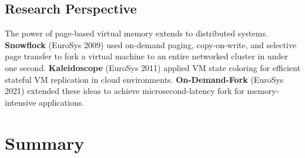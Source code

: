 \documentclass[11pt]{article}
\begin{document}
\subsection{Research Perspective}

The power of page-based virtual memory extends to distributed systems. \textbf{Snowflock} (EuroSys 2009) used on-demand paging, copy-on-write, and selective page transfer to fork a virtual machine to an entire networked cluster in under one second. \textbf{Kaleidoscope} (EuroSys 2011) applied VM state coloring for efficient stateful VM replication in cloud environments. \textbf{On-Demand-Fork} (EuroSys 2021) extended these ideas to achieve microsecond-latency fork for memory-intensive applications.

\section{Summary}
\end{document}
